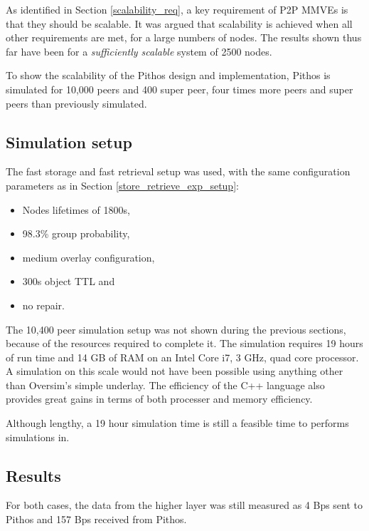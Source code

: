 As identified in Section \ref{scalability_req}, a key requirement of P2P MMVEs is that they should be scalable. It was argued that scalability is achieved when all other requirements are met, for a large numbers of nodes. The results shown thus far have been for a \emph{sufficiently scalable} system of 2500 nodes.

To show the scalability of the Pithos design and implementation, Pithos is simulated for 10,000 peers and 400 super peer, four times more peers and super peers than previously simulated.

\subsection{Simulation setup}

The fast storage and fast retrieval setup was used, with the same configuration parameters as in Section \ref{store_retrieve_exp_setup}:
%
\begin{itemize}
\item Nodes lifetimes of 1800s,
\item 98.3\% group probability,
\item medium overlay configuration,
\item 300s object TTL and
\item no repair.
\end{itemize}


The 10,400 peer simulation setup was not shown during the previous sections, because of the resources required to complete it. The simulation requires 19 hours of run time and 14 GB of RAM on an Intel Core i7, 3 GHz, quad core processor. A simulation on this scale would not have been possible using anything other than Oversim's simple underlay. The efficiency of the C++ language also provides great gains in terms of both processer and memory efficiency.

Although lengthy, a 19 hour simulation time is still a feasible time to performs simulations in.

\subsection{Results}

For both cases, the data from the higher layer was still measured as 4 Bps sent to Pithos and 157 Bps received from Pithos.

